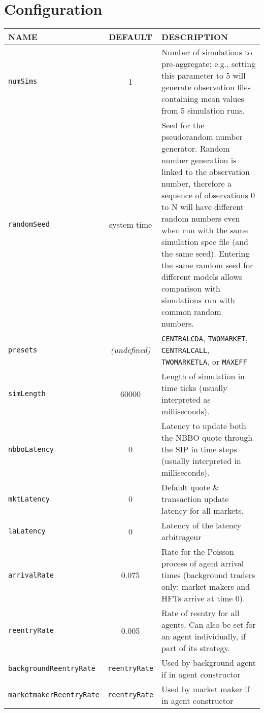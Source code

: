 \documentclass[11pt]{article}
\begin{document}
\section{Configuration}

\begin{table}
\centering
\begin{tabular}[f]{p{} c p{}}
\uppercase{Name}   & \uppercase{Default} & \uppercase{Description} \\ \hline

\texttt{numSims} 		& 1 & Number of simulations to pre-aggregate; e.g., setting this parameter to 5 will generate observation files containing mean values from 5 simulation runs. \\
\texttt{randomSeed} 	& system time & Seed for the pseudorandom number generator. Random number generation is linked to the observation number, therefore a sequence of observations 0 to N will have different random numbers even when run with the same simulation spec file (and the same seed). Entering the same random seed for different models allows comparison with simulations run with common random numbers. \\
\texttt{presets}  		& \emph{(undefined)} & \texttt{CENTRALCDA},
\texttt{TWOMARKET}, \texttt{CENTRALCALL}, \texttt{TWOMARKETLA}, or \texttt{MAXEFF} \\

\texttt{simLength} 	& 60000 & Length of simulation in time ticks (usually interpreted as milliseconds). \\ 

\texttt{nbboLatency} 	& 0 & Latency to update both the NBBO quote through the SIP in time steps (usually interpreted in milliseconds).\\
\texttt{mktLatency} 	& 0 & Default quote \& transaction update latency for
all markets. \\
\texttt{laLatency} 	& 0 & Latency of the latency arbitrageur \\

\texttt{arrivalRate} 	& 0.075 & Rate for the Poisson process of agent arrival times (background traders only; market makers and HFTs arrive at time 0). \\
\texttt{reentryRate} 	& 0.005 & Rate of reentry for all agents. Can also be set for an agent individually, if part of its strategy.\\
\texttt{backgroundReentryRate} & \texttt{reentryRate} & Used by background agent if in agent constructor \\
\texttt{marketmakerReentryRate} & \texttt{reentryRate} & Used by market maker if in agent constructor \\


\end{tabular}
\end{table}
\end{document}
